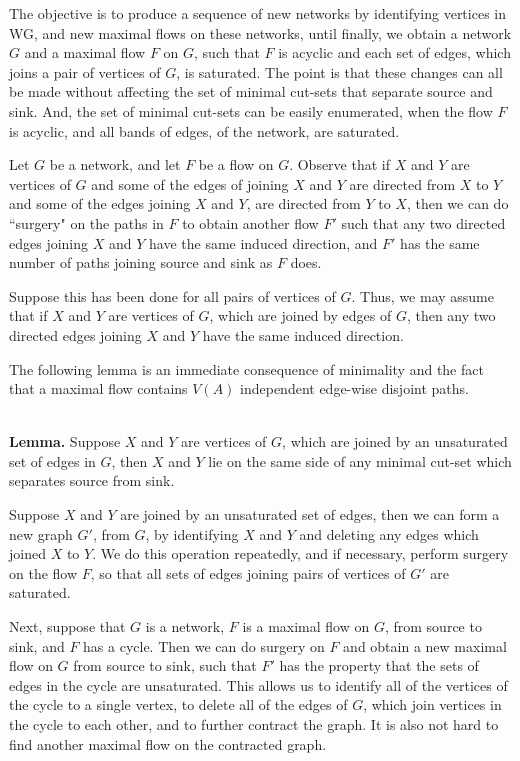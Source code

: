 \documentclass[12pt]{amsart}
\newcommand{\lemma}{\ \\ \noindent  \textbf{Lemma.} }
\begin{document}
                The objective is to produce a sequence of new networks by identifying vertices in
        WG, and new maximal flows on these networks, until finally, we obtain a network $G$ and
        a maximal flow $F$ on $G$, such that $F$ is acyclic and each set of edges, which joins a pair
        of vertices of $G$, is saturated. The point is that these changes can all be made without
        affecting the set of minimal cut-sets that separate source and sink. And, the set of
        minimal cut-sets can be easily enumerated, when the flow $F$ is acyclic, and all bands of
        edges, of the network, are saturated.
        
                Let $G$ be a network, and let $F$ be a flow on $G$. Observe that if $X$ and $Y$ are vertices
        of $G$ and some of the edges of joining $X$ and $Y$ are directed from $X$ to $Y$ and some of the
        edges joining $X$ and $Y$, are directed from $Y$ to $X$, then we can do  ``surgery" on the paths
        in $F$ to obtain another flow $F'$ such that any two directed edges joining $X$ and $Y$ have the
        same induced direction, and $F'$ has the same number of paths joining source and sink as
        $F$ does.
                        
                Suppose this has been done for all pairs of vertices of $G$. Thus, we may assume that
        if $X$ and $Y$ are vertices of $G$, which are joined by edges of $G$, then any two directed
        edges joining $X$ and $Y$ have the same induced direction.
                
                The following lemma is an immediate consequence of minimality and the fact that a
        maximal flow contains $V(A)$ independent edge-wise disjoint paths.
        
        \lemma  Suppose $X$ and $Y$ are vertices of $G$, which are joined by an unsaturated set of
        edges in $G$, then $X$ and $Y$ lie on the same side of any minimal cut-set which separates
        source from sink.
                        
                Suppose $X$ and $Y$ are joined by an unsaturated set of edges, then we can form a new graph
        $G'$, from $G$, by identifying $X$ and $Y$ and deleting any edges which joined $X$ to $Y$. We do
        this operation repeatedly, and if necessary, perform surgery on the flow $F$, so that all
        sets of edges joining pairs of vertices of $G'$ are saturated.
        
                Next, suppose that $G$ is a network, $F$ is a maximal flow on $G$, from source to sink,
        and $F$ has a cycle. Then we can do surgery on $F$ and obtain a new maximal flow on $G$ from
        source to sink, such that $F'$ has the property that the sets of edges in the cycle are
        unsaturated. This allows us to identify all of the vertices of the cycle to a single
        vertex, to delete all of the edges of $G$, which join vertices in the cycle to each other,
        and to further contract the graph. It is also not hard to find another maximal flow on
        the contracted graph.
        
\end{document}
